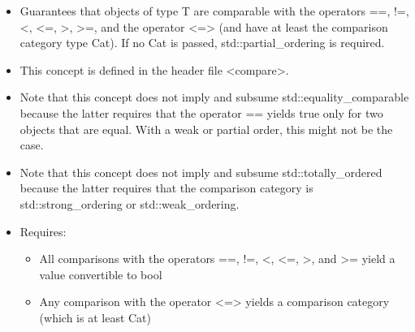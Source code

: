 

\begin{itemize}
\item
Guarantees that objects of type T are comparable with the operators ==, !=, <, <=, >, >=, and the operator <=> (and have at least the comparison category type Cat). If no Cat is passed, std::partial\_ordering is required.

\item
This concept is defined in the header file <compare>.

\item
Note that this concept does not imply and subsume std::equality\_comparable because the latter requires that the operator == yields true only for two objects that are equal. With a weak or partial order, this might not be the case.

\item
Note that this concept does not imply and subsume std::totally\_ordered because the latter requires that the comparison category is std::strong\_ordering or std::weak\_ordering.

\item
Requires:
\begin{itemize}
\item
All comparisons with the operators ==, !=, <, <=, >, and >= yield a value convertible to bool

\item
Any comparison with the operator <=> yields a comparison category (which is at least Cat)
\end{itemize}
\end{itemize}


